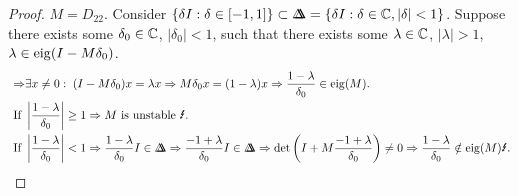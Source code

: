 \begin{proof} $M = D_{22}$. 
	Consider $\{\delta I: \delta \in [-1,1]\} \subset \Delta\!\!\!\!\Delta = \{\delta I : \delta \in {\mathbb{C}}, |\delta| < 1\}$.
	Suppose there exists some $\delta_0 \in {\mathbb{C}}$, $|\delta_0| < 1$, such that there exists some $\lambda \in {\mathbb{C}}$, $|\lambda|>1$, $\lambda \in \operatorname{eig}(I - M\delta_0)$. 
	\begin{align*}
	\Rightarrow& \exists x\neq 0: \; (I - M \delta_0 ) x = \lambda x \Rightarrow M \delta_0 x = (1-  \lambda) x 
	\Rightarrow \frac{1-\lambda}{\delta_0} \in \eig(M). \\
	\text{ If }& \left|\frac{1- \lambda}{\delta_0}\right| \geq 1 \Rightarrow M \text{ is unstable } \text{\Lightning}.\\
	\text{ If }& \left|\frac{1 - \lambda}{\delta_0}\right| < 1 \Rightarrow \frac{1 - \lambda}{\delta_0}I \in \Delta\!\!\!\!\Delta \Rightarrow \frac{-1 +\lambda}{\delta_0}I \in \Delta\!\!\!\!\Delta \Rightarrow \det\left(I + M \frac{-1 + \lambda}{\delta_0}\right) \neq 0 \Rightarrow \frac{1 - \lambda}{\delta_0} \notin \eig(M) \text{\Lightning}.
	\end{align*}
\end{proof}
%
%
%
%
